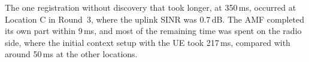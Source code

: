 The one registration without discovery that took longer, at 350\,ms, occurred at Location C in Round~3, where the uplink \gls{SINR} was 0.7\,dB. The \gls{AMF} completed its own part within 9\,ms, and most of the remaining time was spent on the radio side, where the initial context setup with the \gls{UE} took 217\,ms, compared with around 50\,ms at the other locations.

